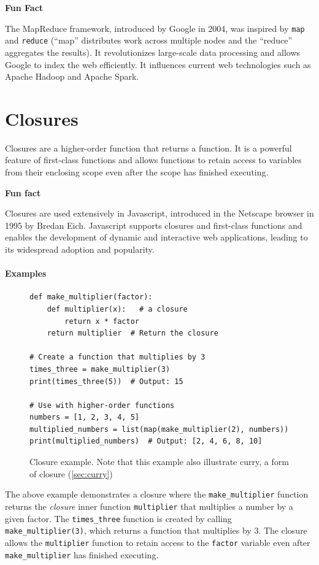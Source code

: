 \documentclass[oneside,11pt,dvipsnames]{book}
\newenvironment{historybox}[1][]{
  \small
  \begin{myhistorybox}
    {\small \textbf{#1}}
  }{
  \end{myhistorybox}
}
\newcommand{\code}[1]{\texttt{#1}}
\begin{document}
\begin{historybox}[Fun Fact]
The MapReduce framework, introduced by Google in 2004, was inspired by \code{map} and \code{reduce} (``map'' distributes work across multiple nodes and the ``reduce'' aggregates the results).  It revolutionizes large-scale data processing and allows Google to index the web efficiently. It influences current web technologies such as Apache Hadoop and Apache Spark.
\end{historybox}

\section{Closures}
Closures are a higher-order function that returns a function. It is a powerful feature of first-class functions and allows functions to retain access to variables from their enclosing scope even after the scope has finished executing.

\begin{historybox}[Fun fact] 
    Closures are used extensively in Javascript, introduced in the Netscape browser in 1995 by Bredan Eich. Javascript supports closures and first-class functions and enables the development of dynamic and interactive web applications, leading to its widespread adoption and popularity.
\end{historybox}
\paragraph{Examples}
\begin{figure}
\begin{lstlisting}
def make_multiplier(factor):
    def multiplier(x):   # a closure
        return x * factor
    return multiplier  # Return the closure

# Create a function that multiplies by 3
times_three = make_multiplier(3)
print(times_three(5))  # Output: 15

# Use with higher-order functions
numbers = [1, 2, 3, 4, 5]
multiplied_numbers = list(map(make_multiplier(2), numbers))
print(multiplied_numbers)  # Output: [2, 4, 6, 8, 10]
\end{lstlisting}
\caption{Closure example. Note that this example also illustrate curry, a form of closure (\autoref{sec:curry})}\label{ex:closure-example}
\end{figure}

The above example demonstrates a closure where the \code{make\_multiplier} function returns the \emph{closure} inner function \code{multiplier} that multiplies a number by a given factor. The \code{times\_three} function is created by calling \code{make\_multiplier(3)}, which returns a function that multiplies by 3. The closure allows the \code{multiplier} function to retain access to the \code{factor} variable even after \code{make\_multiplier} has finished executing.
\end{document}
